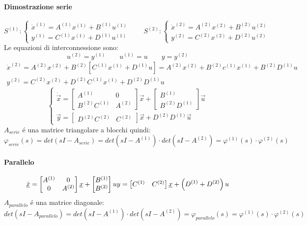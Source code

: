 \documentclass[../main.tex]{subfiles}
\begin{document}
		\paragraph{Dimostrazione serie}
			\[
				S^{(1)}:
				\begin{cases}
					\dot x^{(1)} = A^{(1)} x^{(1)} + B^{(1)} u^{(1)}\\
					y^{(1)} = C^{(1)} x^{(1)} + D^{(1)} u^{(1)}
				\end{cases}
				\qquad
				S^{(2)}:
				\begin{cases}
					\dot x^{(2)} = A^{(2)} x^{(2)} + B^{(2)} u^{(2)}\\
					y^{(2)} = C^{(2)} x^{(2)} + D^{(2)} u^{(2)}
				\end{cases}
			\]
			Le equazioni di interconnessione sono:
			\[
				u^{(2)} = y^{(1)} \qquad u^{(1)} = u \qquad y = y^{(2)}
			\]
			\[
				\begin{aligned}
					\dot x^{(2)} = A^{(2)} x^{(2)} + B^{(2)} \left[ C^{(1)} x^{(1)} + D^{(1)} u \right] = A^{(2)} x^{(2)} + B^{(2)} c^{(1)} x^{(1)} + B^{(2)} D^{(1)} u
					\\
					y^{(2)} = C^{(2)} x^{(2)} + D^{(2)} C^{(1)} x^{(1)} + D^{(2)} D^{(1)} u
				\end{aligned}
			\]
			\[
				\begin{cases}
						\dot{\vec x} =
						\begin{bmatrix}
							A^{(1)} & 0\\
							B^{(2)} C^{(1)} & A^{(2)}
						\end{bmatrix} \vec x +
						\begin{bmatrix}
							B^{(1)}\\
							B^{(2)} D^{(1)}
						\end{bmatrix} \vec u
						\\
						\vec y =
						\begin{bmatrix}
							D^{(2)} C^{(2)} & C^{(2)}
						\end{bmatrix} \vec x + 
						D^{(2)} D^{(1)} \vec u
				\end{cases}
			\]
			$ A_{serie} $ \'e una matrice triangolare a blocchi quindi:
			\[
				\varphi_{serie}(s) = det(sI-A_{serie}) = det(sI-A^{(1)}) \cdot det(sI-A^{(2)}) = \varphi^{(1)}(s) \cdot \varphi^{(2)}(s)
			\]
		\paragraph{Parallelo}
			\[
				\dot{\vec x} = 
				\begin{bmatrix}
					A^{(1)} & 0\\
					0 & A^{(2)}
				\end{bmatrix} \vec x +
				\begin{bmatrix}
					B^{(1)}\\
					B^{(2)}
				\end{bmatrix} u
				\\
				y = 
				\begin{bmatrix}
					C^{(1)} & C^{(2)}
				\end{bmatrix} \vec x +
				\left( D^{(1)} + D^{(2)} \right) u
			\]
			$ A_{parallelo} $ \'e una matrice diagonale:
			\[
				det(sI-A_{parallelo}) = det(sI-A^{(1)}) \cdot det(sI-A^{(2)}) = \varphi_{parallelo}(s) = \varphi^{(1)}(s) \cdot \varphi^{(2)}(s)
			\]
\end{document}
